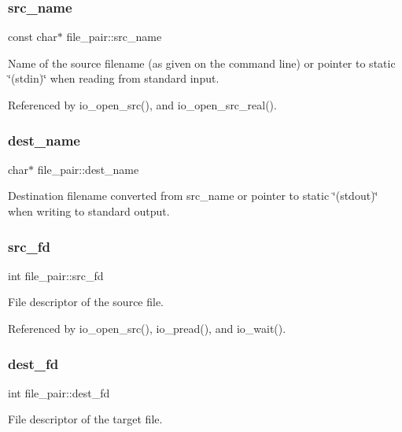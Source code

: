 \subsubsection{src\+\_\+name}
{\footnotesize\ttfamily const char$\ast$ file\+\_\+pair\+::src\+\_\+name}

Name of the source filename (as given on the command line) or pointer to static \char`\"{}(stdin)\char`\"{} when reading from standard input. 

Referenced by io\+\_\+open\+\_\+src(), and io\+\_\+open\+\_\+src\+\_\+real().

\mbox{\label{structfile__pair_a7f1b46a8a665881ffa22d2d7b33b91ed}} 
\subsubsection{dest\+\_\+name}
{\footnotesize\ttfamily char$\ast$ file\+\_\+pair\+::dest\+\_\+name}

Destination filename converted from src\+\_\+name or pointer to static \char`\"{}(stdout)\char`\"{} when writing to standard output. \mbox{\label{structfile__pair_acbab9ee46b39f49a7996360ae6dbe0a4}} 
\subsubsection{src\+\_\+fd}
{\footnotesize\ttfamily int file\+\_\+pair\+::src\+\_\+fd}



File descriptor of the source file. 



Referenced by io\+\_\+open\+\_\+src(), io\+\_\+pread(), and io\+\_\+wait().

\mbox{\label{structfile__pair_a95b05b836e2abd7cb9b227f03dcb5492}} 
\subsubsection{dest\+\_\+fd}
{\footnotesize\ttfamily int file\+\_\+pair\+::dest\+\_\+fd}



File descriptor of the target file. 



